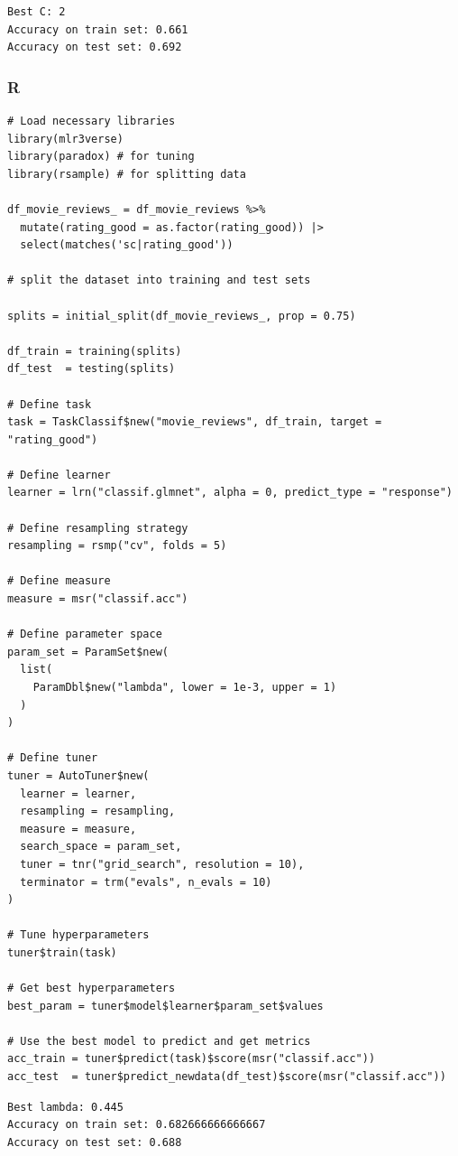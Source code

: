 \documentclass[
  letterpaper,
]{krantz}
\begin{document}
\hypertarget{tbl-tune-results-py}{}
\begin{verbatim}
Best C: 2
Accuracy on train set: 0.661
Accuracy on test set: 0.692
\end{verbatim}

\subsubsection{R}

\begin{verbatim}
# Load necessary libraries
library(mlr3verse)
library(paradox) # for tuning
library(rsample) # for splitting data

df_movie_reviews_ = df_movie_reviews %>% 
  mutate(rating_good = as.factor(rating_good)) |> 
  select(matches('sc|rating_good'))

# split the dataset into training and test sets

splits = initial_split(df_movie_reviews_, prop = 0.75)

df_train = training(splits)
df_test  = testing(splits)

# Define task
task = TaskClassif$new("movie_reviews", df_train, target = "rating_good")

# Define learner
learner = lrn("classif.glmnet", alpha = 0, predict_type = "response")

# Define resampling strategy
resampling = rsmp("cv", folds = 5)

# Define measure
measure = msr("classif.acc")

# Define parameter space
param_set = ParamSet$new(
  list(
    ParamDbl$new("lambda", lower = 1e-3, upper = 1)
  )
)

# Define tuner
tuner = AutoTuner$new(
  learner = learner,
  resampling = resampling,
  measure = measure,
  search_space = param_set,
  tuner = tnr("grid_search", resolution = 10),
  terminator = trm("evals", n_evals = 10)
)

# Tune hyperparameters
tuner$train(task)

# Get best hyperparameters
best_param = tuner$model$learner$param_set$values

# Use the best model to predict and get metrics
acc_train = tuner$predict(task)$score(msr("classif.acc"))
acc_test  = tuner$predict_newdata(df_test)$score(msr("classif.acc"))
\end{verbatim}

\hypertarget{tbl-tune-results-r}{}
\begin{verbatim}
Best lambda: 0.445
Accuracy on train set: 0.682666666666667
Accuracy on test set: 0.688
\end{verbatim}
\end{document}
